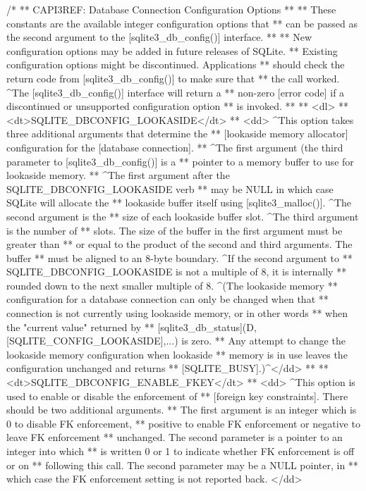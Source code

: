 \begin{Codex}[label=sqlite3.h,numbers=left]
{/*
** CAPI3REF: Database Connection Configuration Options
**
** These constants are the available integer configuration options that
** can be passed as the second argument to the [sqlite3_db_config()] interface.
**
** New configuration options may be added in future releases of SQLite.
** Existing configuration options might be discontinued.  Applications
** should check the return code from [sqlite3_db_config()] to make sure that
** the call worked.  ^The [sqlite3_db_config()] interface will return a
** non-zero [error code] if a discontinued or unsupported configuration option
** is invoked.
**
** <dl>
** <dt>SQLITE_DBCONFIG_LOOKASIDE</dt>
** <dd> ^This option takes three additional arguments that determine the 
** [lookaside memory allocator] configuration for the [database connection].
** ^The first argument (the third parameter to [sqlite3_db_config()] is a
** pointer to a memory buffer to use for lookaside memory.
** ^The first argument after the SQLITE_DBCONFIG_LOOKASIDE verb
** may be NULL in which case SQLite will allocate the
** lookaside buffer itself using [sqlite3_malloc()]. ^The second argument is the
** size of each lookaside buffer slot.  ^The third argument is the number of
** slots.  The size of the buffer in the first argument must be greater than
** or equal to the product of the second and third arguments.  The buffer
** must be aligned to an 8-byte boundary.  ^If the second argument to
** SQLITE_DBCONFIG_LOOKASIDE is not a multiple of 8, it is internally
** rounded down to the next smaller multiple of 8.  ^(The lookaside memory
** configuration for a database connection can only be changed when that
** connection is not currently using lookaside memory, or in other words
** when the "current value" returned by
** [sqlite3_db_status](D,[SQLITE_CONFIG_LOOKASIDE],...) is zero.
** Any attempt to change the lookaside memory configuration when lookaside
** memory is in use leaves the configuration unchanged and returns 
** [SQLITE_BUSY].)^</dd>
**
** <dt>SQLITE_DBCONFIG_ENABLE_FKEY</dt>
** <dd> ^This option is used to enable or disable the enforcement of
** [foreign key constraints].  There should be two additional arguments.
** The first argument is an integer which is 0 to disable FK enforcement,
** positive to enable FK enforcement or negative to leave FK enforcement
** unchanged.  The second parameter is a pointer to an integer into which
** is written 0 or 1 to indicate whether FK enforcement is off or on
** following this call.  The second parameter may be a NULL pointer, in
** which case the FK enforcement setting is not reported back. </dd>
}
\end{Codex}

